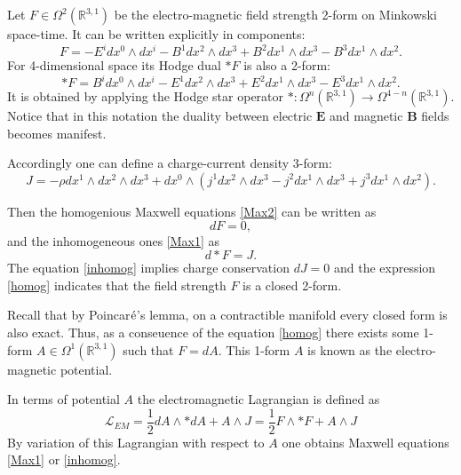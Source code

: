 \documentclass[11pt]{report}
\theoremstyle{plain}
\theoremstyle{definition}
\theoremstyle{remark}
\theoremstyle{remark}
\numberwithin{equation}{section}
\begin{document}
Let $F \in \Omega^2(\mathbb{R}^{3,1})$ be the electro-magnetic field strength 2-form on Minkowski space-time. It can be written explicitly in components:
%
\begin{equation}
F = - E^idx^0\wedge dx^i - B^1dx^2\wedge dx^3 +B^2dx^1\wedge dx^3 - B^3dx^1\wedge dx^2.
\end{equation}
%
For 4-dimensional space its Hodge dual $\ast F$ is also a 2-form:
%
\begin{equation}
\ast F = B^idx^0\wedge dx^i-E^1 dx^2\wedge dx^3 +E^2 dx^1\wedge dx^3 -E^3dx^1\wedge dx^2.
\end{equation}
It is obtained by applying the Hodge star operator $\ast : \Omega^n(\mathbb{R}^{3,1})\to \Omega^{4-n}(\mathbb{R}^{3,1})$. Notice that in this notation the duality between electric $\mathbf{E}$ and magnetic $\mathbf{B}$ fields becomes manifest. 

Accordingly one can define a charge-current density 3-form:
%
\begin{equation}
J = -\rho dx^1\wedge dx^2\wedge dx^3 + dx^0\wedge (j^1dx^2\wedge dx^3 - j^2 dx^1\wedge dx^3 +j^3dx^1\wedge dx^2). 
\end{equation}
%

Then the homogenious Maxwell equations \eqref{Max2} can be written as
%
\begin{equation}\label{homog}
dF=0,
\end{equation}
and the inhomogeneous ones \eqref{Max1} as 
%
\begin{equation}\label{inhomog}
d\ast F=J.
\end{equation}
%
The equation \eqref{inhomog} implies charge conservation $dJ=0$ and the expression \eqref{homog} indicates that the field strength $F$ is a closed 2-form.

Recall that by Poincar$\rm \acute{e}$\rq{}s lemma, on a contractible manifold every closed form is also exact. Thus, as a conseuence of the  equation \eqref{homog} there exists some 1-form $A \in \Omega^1(\mathbb{R}^{3,1})$ such that $F=dA$. This 1-form $A$ is known as the electro-magnetic potential. 

In terms of potential $A$ the electromagnetic Lagrangian is defined as
%
\begin{equation}
\mathcal{L}_{EM} = \frac{1}{2}dA\wedge \ast dA + A\wedge J = \frac{1}{2}F\wedge \ast F + A\wedge J
\end{equation}
By variation of this Lagrangian with respect to $A$ one obtains Maxwell equations \eqref{Max1} or \eqref{inhomog}.
\end{document}
